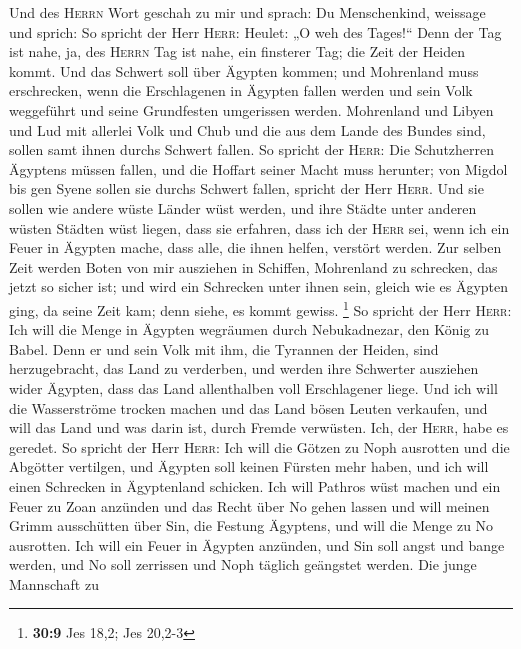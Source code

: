  Und des \textsc{Herrn} Wort geschah zu mir und sprach:
 Du Menschenkind, weissage und sprich: So spricht der Herr
\textsc{Herr}: Heulet: „O weh des Tages!{}``  Denn der Tag
ist nahe, ja, des \textsc{Herrn} Tag ist nahe, ein finsterer Tag; die
Zeit der Heiden kommt.  Und das Schwert soll über Ägypten
kommen; und Mohrenland muss erschrecken, wenn die Erschlagenen in
Ägypten fallen werden und sein Volk weggeführt und seine Grundfesten
umgerissen werden.  Mohrenland und Libyen und Lud mit
allerlei Volk und Chub und die aus dem Lande des Bundes sind, sollen
samt ihnen durchs Schwert fallen.  So spricht der
\textsc{Herr}: Die Schutzherren Ägyptens müssen fallen, und die Hoffart
seiner Macht muss herunter; von Migdol bis gen Syene sollen sie durchs
Schwert fallen, spricht der Herr \textsc{Herr}.  Und sie
sollen wie andere wüste Länder wüst werden, und ihre Städte unter
anderen wüsten Städten wüst liegen,  dass sie erfahren,
dass ich der \textsc{Herr} sei, wenn ich ein Feuer in Ägypten mache,
dass alle, die ihnen helfen, verstört werden.  Zur selben
Zeit werden Boten von mir ausziehen in Schiffen, Mohrenland zu
schrecken, das jetzt so sicher ist; und wird ein Schrecken unter ihnen
sein, gleich wie es Ägypten ging, da seine Zeit kam; denn siehe, es
kommt gewiss. \footnote{\textbf{30:9} Jes 18,2; Jes 20,2-3}
 So spricht der Herr \textsc{Herr}: Ich will die Menge in
Ägypten wegräumen durch Nebukadnezar, den König zu Babel.
 Denn er und sein Volk mit ihm, die Tyrannen der Heiden,
sind herzugebracht, das Land zu verderben, und werden ihre Schwerter
ausziehen wider Ägypten, dass das Land allenthalben voll Erschlagener
liege.  Und ich will die Wasserströme trocken machen und
das Land bösen Leuten verkaufen, und will das Land und was darin ist,
durch Fremde verwüsten. Ich, der \textsc{Herr}, habe es geredet.
 So spricht der Herr \textsc{Herr}: Ich will die Götzen
zu Noph ausrotten und die Abgötter vertilgen, und Ägypten soll keinen
Fürsten mehr haben, und ich will einen Schrecken in Ägyptenland
schicken.  Ich will Pathros wüst machen und ein Feuer zu
Zoan anzünden und das Recht über No gehen lassen  und
will meinen Grimm ausschütten über Sin, die Festung Ägyptens, und will
die Menge zu No ausrotten.  Ich will ein Feuer in Ägypten
anzünden, und Sin soll angst und bange werden, und No soll zerrissen und
Noph täglich geängstet werden.  Die junge Mannschaft zu
